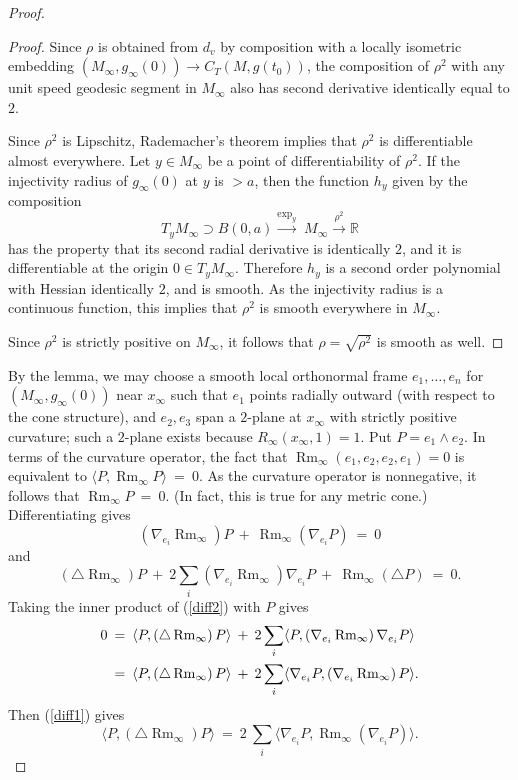 \documentclass[12pt]{amsart}
\newcommand{\lra}{\longrightarrow}
\newcommand{\R}{{\mathbb R}}
\newcommand{\Rm}{\operatorname{Rm}}
\newcommand{\ctits}{C_T}
\newcommand{\ra}{\rightarrow}
\numberwithin{equation}{section}
\theoremstyle{plain}
\theoremstyle{definition}
\theoremstyle{remark}
\begin{document}
\begin{proof}
\begin{proof}
Since $\rho$ is obtained from $d_v$ by composition with a locally isometric
embedding $(M_\infty,g_\infty(0))\ra \ctits(M,g(t_0))$, the composition
of $\rho^2$ with any unit speed geodesic segment in $M_\infty$ 
also has second derivative identically equal to $2$.


Since $\rho^2$ is Lipschitz, Rademacher's theorem implies that $\rho^2$
is differentiable almost everywhere.   
Let $y\in M_\infty$ be a point of differentiability of $\rho^2$.
 If the injectivity radius of $g_\infty(0)$ at 
$y$ is $>a$, then the function $h_y$ given by  the composition 
$$
T_yM_\infty\supset B(0,a)\stackrel{\exp_y}{\lra}\;M_\infty
\stackrel{\rho^2}{\lra}\R
$$
has the property that its second radial derivative is identically $2$,
and it is differentiable at the origin $0\in T_yM_\infty$.
Therefore 
$h_y$ is a second order polynomial with Hessian identically $2$,
and is smooth.  As the injectivity radius is a continuous function, this
implies that $\rho^2$ is smooth everywhere in $M_\infty$.

Since $\rho^2$ is strictly positive on $M_\infty$, 
it follows that $\rho=\sqrt{\rho^2}$ 
is smooth as well.
\end{proof}

By the lemma, we may choose a smooth local orthonormal
frame $e_1,\ldots,e_n$ for $(M_\infty,g_\infty(0))$
near $x_\infty$ such that $e_1$ points radially outward (with respect to the 
cone structure), and $e_2,e_3$ span a $2$-plane at $x_\infty$ with strictly
positive curvature; 
such a $2$-plane exists because $R_\infty(x_\infty, 1) = 1$.
Put $P = e_1 \wedge e_2$.
In terms of the curvature operator, the fact that
$\Rm_\infty(e_1,e_2,e_2,e_1)=0$ is equivalent to 
$\langle P, \Rm_\infty P \rangle \: = \: 0$.
As the curvature operator is nonnegative, it follows that
$\Rm_\infty P \: = \: 0$. (In fact, this is true for any metric cone.)
Differentiating gives
\begin{equation} \label{diff1}
\left( \nabla_{e_i} \Rm_\infty \right) P \: + \: \Rm_\infty (\nabla_{e_i} P) \: = \: 0
\end{equation}
and
\begin{equation} \label{diff2}
\left( \triangle \Rm_\infty \right) P \: + \: 2 \sum_i \left( \nabla_{e_i} \Rm_\infty \right)
\nabla_{e_i} P \: + \: \Rm_\infty \left( \triangle P \right) \: = \: 0.
\end{equation}
Taking the inner product of (\ref{diff2}) with $P$ gives
\begin{align}
0 \: & = \: \langle P, \left( \triangle \Rm_\infty \right) P \rangle  \: + \: 2 \sum_i
\langle P, \left( \nabla_{e_i} \Rm_\infty \right)
\nabla_{e_i} P \rangle \\ 
& = \: \langle P, \left( \triangle \Rm_\infty \right) P \rangle  \: + \: 2 \sum_i
\langle \nabla_{e_i} P, \left( \nabla_{e_i} \Rm_\infty \right)
P \rangle. \notag
\end{align}
Then  (\ref{diff1}) gives
\begin{equation}
\langle P, (\triangle \Rm_\infty) P \rangle \: = \:  2 \:
\sum_i \langle \nabla_{e_i} P,  \Rm_\infty \left( \nabla_{e_i} P \right)  \rangle.
\end{equation}


\end{proof}
\end{document}
